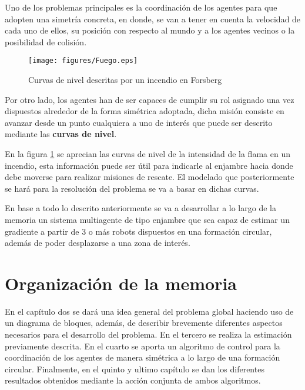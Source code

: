Uno de los problemas principales es la coordinación de los agentes para que adopten una simetría concreta, en donde, se van a tener en cuenta la velocidad de cada uno de ellos, su posición con respecto al mundo y a los agentes vecinos o la posibilidad de colisión.\\



\begin{figure}[htb]
\centering
\texttt{[image: figures/Fuego.eps]}
\caption{Curvas de nivel descritas por un incendio en Forsberg} \label{fig:countour_levels}
\end{figure}

\newpage

Por otro lado, los agentes han de ser capaces de cumplir su rol asignado una vez dispuestos alrededor de la forma simétrica adoptada, dicha misión consiste en avanzar desde un punto cualquiera a uno de interés que puede ser descrito mediante las \textbf{curvas de nivel}.

En la figura \ref{fig:countour_levels} se aprecian las curvas de nivel de la intensidad de la flama en un incendio, esta información puede ser útil para indicarle al enjambre hacia donde debe moverse para realizar misiones de rescate. El modelado que posteriormente se hará para la resolución del problema se va a basar en dichas curvas. 

En base a todo lo descrito anteriormente se va a desarrollar a lo largo de la memoria un sistema multiagente de tipo enjambre que sea capaz de estimar un gradiente a partir de 3 o más robots dispuestos en una formación circular, además de poder desplazarse a una zona de interés.

\section{Organización de la memoria}

En el capítulo dos se dará una idea general del problema global haciendo uso de un diagrama de bloques, además, de describir brevemente diferentes aspectos necesarios para el desarrollo del problema. En el tercero se realiza la estimación previamente descrita. En el cuarto se aporta un algoritmo de control para la coordinación de los agentes de manera simétrica a lo largo de una formación circular. Finalmente, en el quinto y ultimo capítulo se dan los diferentes resultados obtenidos mediante la acción conjunta de ambos algoritmos.